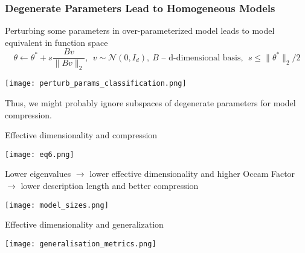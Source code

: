 \documentclass[10pt]{beamer}
\begin{document}
\begin{frame}
    \frametitle{Degenerate Parameters Lead to Homogeneous Models}
    Perturbing some parameters in over-parameterized model leads to model equivalent in function space
    $$\theta \longleftarrow \theta^* + s\frac{Bv}{\|Bv\|_2}, ~~v\sim \mathcal{N}(0, I_d), ~B \text{ -- d-dimensional basis}, ~~s \leqslant\|\theta^*\|_2/2$$
    \begin{center}
        \texttt{[image: perturb\_params\_classification.png]}
    \end{center}
    Thus, we might probably ignore subspaces of degenerate parameters for model compression.
\end{frame}

\begin{frame}{Effective dimensionality and compression}
    \begin{center}
        \texttt{[image: eq6.png]}
    \end{center}
    Lower eigenvalues $\rightarrow$ lower effective dimensionality and higher Occam Factor $\rightarrow$ lower description length and better compression 
    \begin{center}
        \texttt{[image: model\_sizes.png]}
    \end{center}
\end{frame}

\begin{frame}{Effective dimensionality and generalization}

    \begin{center}
        \texttt{[image: generalisation\_metrics.png]}
    \end{center}
\end{frame}
\end{document}
